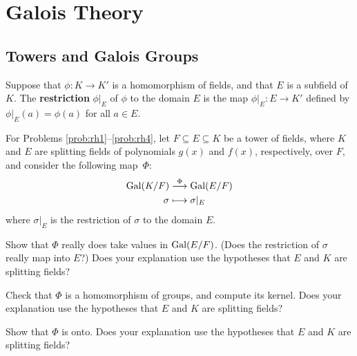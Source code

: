 \chapter{Galois Theory}\label{chap:galois}

\section{Towers and Galois Groups}

\begin{definition}
    Suppose that $\phi:K \longrightarrow K'$ is a homomorphism of fields, and that $E$ is a subfield of $K$. The \textbf{restriction} $\phi|_E$ of $\phi$ to the domain $E$ is the map $\phi|_E : E \longrightarrow K'$ defined by $\phi|_E(a)=\phi(a)$ for all $a\in E$.
\end{definition}

For Problems \ref{prob:rh1}--\ref{prob:rh4},
let $F\subseteq E\subseteq K$ be a tower of fields, where $K$ and $E$ are splitting fields of polynomials $g(x)$ and $f(x)$, respectively, over $F$, and consider the following map~$\Phi$:
\begin{align*}
\operatorname{Gal}(K/F) &\stackrel{\Phi}{\longrightarrow} \operatorname{Gal}(E/F) \\
\sigma &\longmapsto \sigma|_E
\end{align*}
where $\sigma|_E$ is the restriction of $\sigma$ to the domain $E$.
\begin{annotation}
\end{annotation}

\begin{problem}\label{prob:rh1}
    Show that $\Phi$ really does take values in $\operatorname{Gal}(E/F)$. (Does the restriction of $\sigma$ really map into $E$?) Does your explanation use the hypotheses that $E$ and $K$ are splitting fields?
\end{problem}

\begin{problem}
Check that $\Phi$ is a homomorphism of groups, and compute its kernel. Does your explanation use the hypotheses that $E$ and $K$ are splitting fields?
\end{problem}

\begin{problem}
Show that $\Phi$ is onto. Does your explanation use the hypotheses that $E$ and $K$ are splitting fields?
\end{problem}

